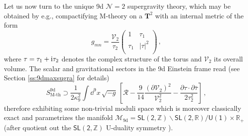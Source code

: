Let us now turn to the unique 9d $\mathcal{N}=2$ supergravity theory, which may be obtained by e.g., compactifying M-theory on a $\mathbf{T}^2$ with an internal metric of the form
%
\begin{equation}\label{eq:T2metric}
	g_{m n}= \frac{\mathcal{V}_2}{\tau_2} \left(
	\begin{array}{cc}
		1 & \tau_1  \\
		\tau_1 & |\tau|^2  \\
	\end{array}
	\right) \, ,
\end{equation}
%
where $\tau=\tau_1+{\rm i}\tau_2$ denotes the complex structure of the torus and $\mathcal{V}_2$ its overall volume. The scalar and gravitational sectors in the 9d Einstein frame read (see Section \ref{ss:9dmaxsugra} for details)
%
\begin{equation}\label{eq:9dchap5}
	S_\text{M-th}^{\text{9d}} \supset \frac{1}{2\kappa_9^2} \int \dd^{9}x\, \sqrt{-g}\,  \left[ \mathcal{R} - \frac{9}{14} \frac{\left( \partial \mathcal{V}_2 \right)^2}{\mathcal{V}_2^2} -\frac{\partial \tau \cdot \partial \bar \tau}{2 \tau_2^2} \right]\, ,
\end{equation}
%
therefore exhibiting some non-trivial moduli space which is moreover classically exact and parametrizes the manifold $\mathcal{M}_{\text{9d}}=\mathsf{SL(2,\mathbb{Z})}\backslash \mathsf{SL(2,\mathbb{R})}/\mathsf{U(1)} \times \mathbb{R}_{+}$ (after quotient out the $\mathsf{SL(2,\mathbb{Z})}$ U-duality symmetry \cite{Schwarz:1995dk,Aspinwall:1995fw}). 

